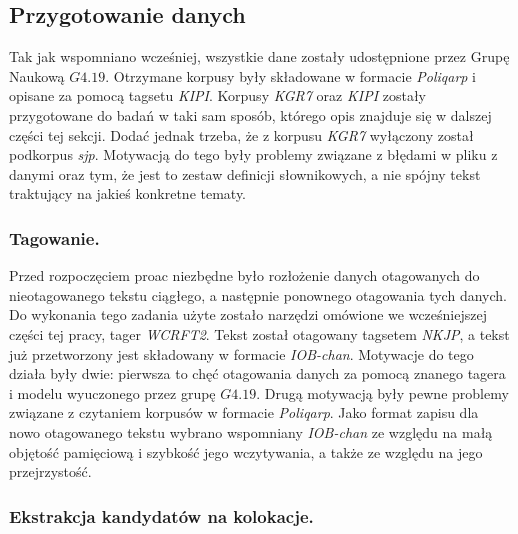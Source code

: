 \documentclass[11pt,a4paper]{llncs}
\begin{document}
\subsection{Przygotowanie danych}

Tak jak wspomniano wcześniej, wszystkie dane zostały udostępnione przez Grupę Naukową $G4.19$.
Otrzymane korpusy były składowane w formacie \emph{Poliqarp} i opisane za pomocą tagsetu \emph{KIPI}.
Korpusy \emph{KGR7} oraz \emph{KIPI} zostały przygotowane do badań w taki sam sposób, którego opis znajduje się w dalszej części tej sekcji.
Dodać jednak trzeba, że z korpusu \emph{KGR7} wyłączony został podkorpus \emph{sjp}.
Motywacją do tego były problemy związane z błędami w pliku z danymi oraz tym, że jest to zestaw definicji słownikowych, a nie spójny tekst traktujący na jakieś konkretne tematy.

\subsubsection{Tagowanie.}

Przed rozpoczęciem proac niezbędne było rozłożenie danych otagowanych do nieotagowanego tekstu ciągłego, a następnie ponownego otagowania tych danych.
Do wykonania tego zadania użyte zostało narzędzi omówione we wcześniejszej części tej pracy, tager \emph{WCRFT2}.
Tekst został otagowany tagsetem \emph{NKJP}, a tekst już przetworzony jest składowany w formacie \emph{IOB-chan}.
Motywacje do tego działa były dwie: pierwsza to chęć otagowania danych za pomocą znanego tagera i modelu wyuczonego przez grupę $G4.19$. 
Drugą motywacją były pewne problemy związane z czytaniem korpusów w formacie \emph{Poliqarp}.
Jako format zapisu dla nowo otagowanego tekstu wybrano wspomniany \emph{IOB-chan} ze względu na małą objętość pamięciową i szybkość jego wczytywania, a także ze względu na jego przejrzystość.

\subsubsection{Ekstrakcja kandydatów na kolokacje.}
\end{document}
